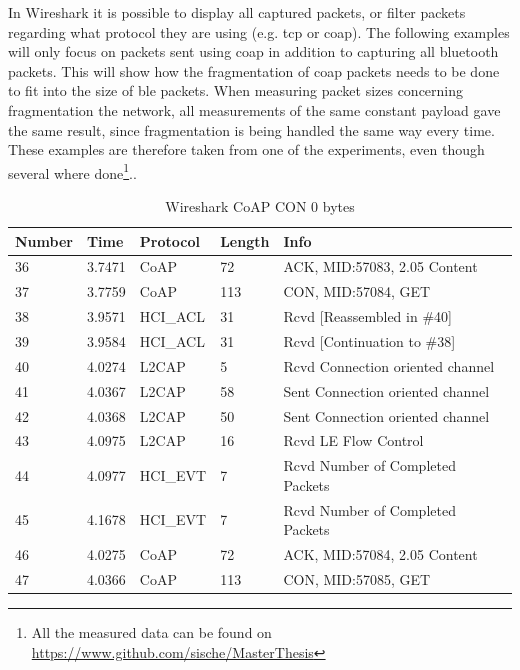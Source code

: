 
\noindent In Wireshark it is possible to display all captured packets, or filter packets regarding what protocol they are using (e.g. \gls{tcp} or \gls{coap}). The following examples will only focus on packets sent using \gls{coap} in addition to capturing all bluetooth packets. This will show how the fragmentation of \gls{coap} packets needs to be done to fit into the size of \gls{ble} packets. When measuring packet sizes concerning fragmentation the network, all measurements of the same constant \gls{payload} gave the same result, since fragmentation is being handled the same way every time. These examples are therefore taken from one of the experiments, even though several where done\footnote{All the measured data can be found on \url{https://www.github.com/sische/MasterThesis}}.. 

\begin{table}[ht]
\centering
\caption{Wireshark CoAP CON 0 bytes}
\label{coapCON0table}
\begin{tabular}{lllll}
Number & Time   & Protocol & Length & Info                             \\ \hline
36     & 3.7471 & CoAP     & 72     & ACK, MID:57083, 2.05 Content     \\
37     & 3.7759 & CoAP     & 113    & CON, MID:57084, GET              \\
38     & 3.9571 & HCI\_ACL & 31     & Rcvd {[}Reassembled in \#40{]}   \\
39     & 3.9584 & HCI\_ACL & 31     & Rcvd {[}Continuation to \#38{]}  \\
40     & 4.0274 & L2CAP    & 5      & Rcvd Connection oriented channel \\
41     & 4.0367 & L2CAP    & 58     & Sent Connection oriented channel \\
42     & 4.0368 & L2CAP    & 50     & Sent Connection oriented channel \\
43     & 4.0975 & L2CAP    & 16     & Rcvd LE Flow Control             \\
44     & 4.0977 & HCI\_EVT & 7      & Rcvd Number of Completed Packets \\
45     & 4.1678 & HCI\_EVT & 7      & Rcvd Number of Completed Packets \\
46     & 4.0275 & CoAP     & 72     & ACK, MID:57084, 2.05 Content     \\
47     & 4.0366 & CoAP     & 113    & CON, MID:57085, GET              \\ \hline
\end{tabular}
\end{table}

